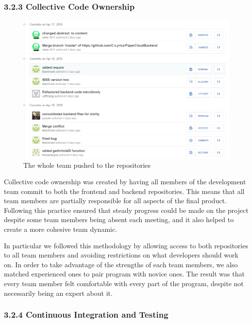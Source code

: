 \documentclass[]{article}
\begin{document}
\subsubsection{3.2.3 Collective Code
Ownership}\label{collective-code-ownership}

\begin{figure}[htbp]
\centering
\includegraphics{images/code_ownership.png}
\caption{The whole team pushed to the repositories}
\end{figure}

Collective code ownership was created by having all members of the
development team commit to both the frontend and backend repositories.
This means that all team members are partially responsible for all
aspects of the final product. Following this practice ensured that
steady progress could be made on the project despite some team members
being absent each meeting, and it also helped to create a more cohesive
team dynamic.

In particular we followed this methodology by allowing access to both
repositories to all team members and avoiding restrictions on what
developers should work on. In order to take advantage of the strengths
of each team members, we also matched experienced ones to pair program
with novice ones. The result was that every team member felt comfortable
with every part of the program, despite not necessarily being an expert
about it.

\subsubsection{3.2.4 Continuous Integration and
Testing}\label{continuous-integration-and-testing}
\end{document}
